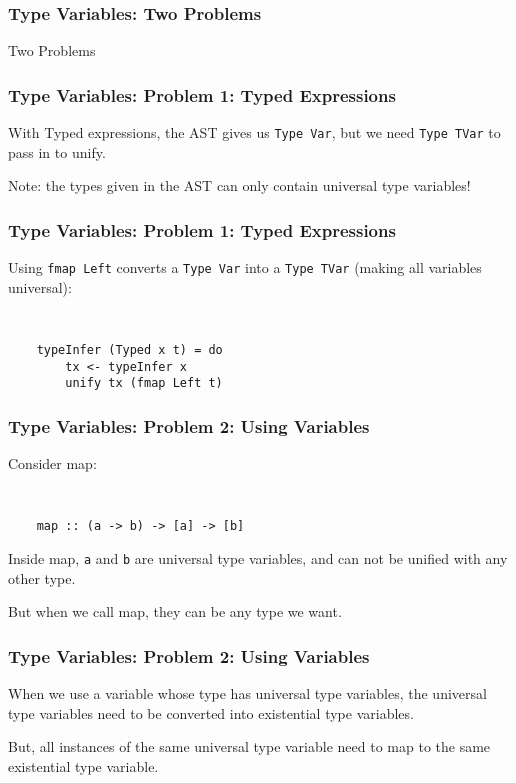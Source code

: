 \documentclass{beamer}
\begin{document}
\begin{frame}
\frametitle{Type Variables: Two Problems}
\Huge{
\begin{center}
Two Problems
\end{center}
}
\end{frame}

\begin{frame}
\frametitle{Type Variables: Problem 1: Typed Expressions}
\Large{
\begin{center}
With Typed expressions, the AST gives us {\tt Type Var}, but we
need {\tt Type TVar} to pass in to unify.

\vspace{40pt}

Note: the types given in the AST can only contain universal type
variables!
\end{center}
}
\end{frame}

\begin{frame}[fragile]
\frametitle{Type Variables: Problem 1: Typed Expressions}

\Large{
Using {\tt fmap Left} converts a {\tt Type Var} into a
{\tt Type TVar} (making all variables universal):

{\tt
\begin{verbatim}
    typeInfer (Typed x t) = do
        tx <- typeInfer x
        unify tx (fmap Left t)
\end{verbatim}
}}
\end{frame}

\begin{frame}[fragile]
\frametitle{Type Variables: Problem 2: Using Variables}
\Large{
Consider map:

{\tt
\begin{verbatim}
    map :: (a -> b) -> [a] -> [b]
\end{verbatim}
}

\vspace{20pt}

\alert{Inside} map, {\tt a} and {\tt b} are universal type variables, and
can not be unified with any other type.

\vspace{20pt}

But when we \alert{call} map, they can be any type we want.
}
\end{frame}

\begin{frame}[fragile]
\frametitle{Type Variables: Problem 2: Using Variables}
\Large{
\begin{center}
When we use a variable whose type has universal type variables, the
universal type variables need to be converted into existential type
variables.

\vspace{20pt}

But, all instances of the same universal type variable need to map
to the same existential type variable.
\end{center}
}
\end{frame}
\end{document}
